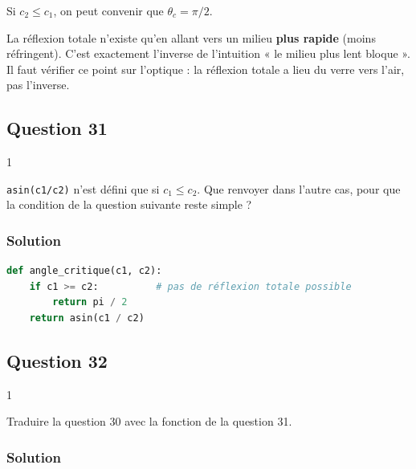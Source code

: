 \documentclass[11pt,a4paper]{article}
\newcommand{\equationajustee}[1]{%
  \sbox{\boiteequation}{$\displaystyle #1$}%
  \ifdim\wd\boiteequation>\linewidth
    \[\resizebox{\linewidth}{!}{\usebox{\boiteequation}}\]%
  \else
    \[#1\]%
  \fi}
\begin{document}
\equationajustee{\boxed{\theta_i < \theta_c = \arcsin\left(\frac{c_1}{c_2}\right)\qquad (c_2 > c_1)}}

Si \(c_2 \le c_1\), on peut convenir que \(\theta_c = \pi/2\).

\begin{piege}

La réflexion totale n'existe qu'en allant vers un milieu \textbf{plus rapide} (moins réfringent). C'est exactement l'inverse de l'intuition « le milieu plus lent bloque ». Il faut vérifier ce point sur l'optique : la réflexion totale a lieu du verre vers l'air, pas l'inverse.

\end{piege}

\hypertarget{question-31}{%
\subsection{Question 31}\label{question-31}}

\begin{indication}{1}

\texttt{asin(c1/c2)} n'est défini que si \(c_1 \le c_2\). Que renvoyer dans l'autre cas, pour que la condition de la question suivante reste simple ?

\end{indication}

\hypertarget{solution-30}{%
\subsubsection{Solution}\label{solution-30}}

\begin{lstlisting}[language=Python]
def angle_critique(c1, c2):
    if c1 >= c2:          # pas de réflexion totale possible
        return pi / 2
    return asin(c1 / c2)
\end{lstlisting}

\hypertarget{question-32}{%
\subsection{Question 32}\label{question-32}}

\begin{indication}{1}

Traduire la question 30 avec la fonction de la question 31.

\end{indication}

\hypertarget{solution-31}{%
\subsubsection{Solution}\label{solution-31}}
\end{document}
